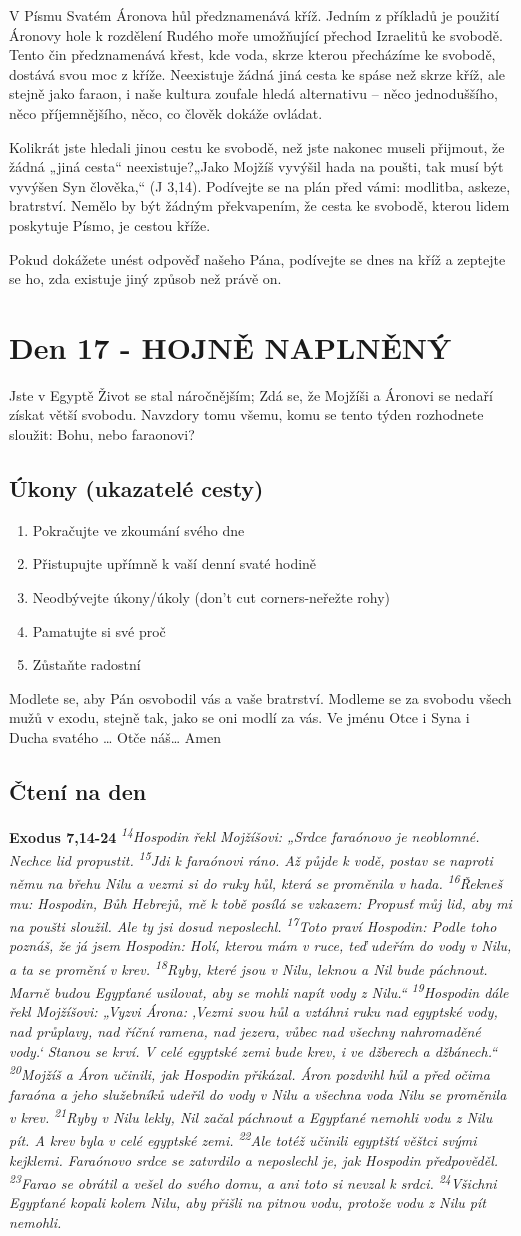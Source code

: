 \documentclass[11pt]{article}
\newcommand{\zacatekTretiTyden}{
  Jste v Egyptě \newline
  Život se stal náročnějším; Zdá se, že Mojžíši a Áronovi se nedaří získat větší svobodu. Navzdory tomu všemu,
komu se tento týden rozhodnete sloužit: Bohu, nebo faraonovi?

\subsection*{Úkony (ukazatelé cesty)}
\begin{enumerate}
  \item Pokračujte ve zkoumání svého dne
  \item Přistupujte upřímně k vaší denní svaté hodině
  \item Neodbývejte úkony/úkoly (don’t cut corners-neřežte rohy)
  \item Pamatujte si své proč
  \item Zůstaňte radostní
\end{enumerate}
Modlete se, aby Pán osvobodil vás a vaše bratrství. \newline
Modleme se za svobodu všech mužů v exodu, stejně tak, jako se oni modlí za vás.\newline
Ve jménu Otce i Syna i Ducha svatého …  Otče náš… Amen
}
\begin{document}
V Písmu Svatém Áronova hůl předznamenává kříž. Jedním z příkladů je použití Áronovy hole k rozdělení
Rudého moře umožňující přechod Izraelitů ke svobodě. Tento čin předznamenává křest, kde voda, skrze
kterou přecházíme ke svobodě, dostává svou moc z kříže. Neexistuje žádná jiná cesta ke spáse než skrze
kříž, ale stejně jako faraon, i naše kultura zoufale hledá alternativu – něco jednoduššího, něco
příjemnějšího, něco, co člověk dokáže ovládat.

Kolikrát jste hledali jinou cestu ke svobodě, než jste nakonec museli přijmout, že žádná „jiná cesta“
neexistuje?„Jako Mojžíš vyvýšil hada na poušti, tak musí být vyvýšen Syn člověka,“ (J 3,14). Podívejte
se na plán před vámi: modlitba, askeze, bratrství. Nemělo by být žádným překvapením, že cesta ke
svobodě, kterou lidem poskytuje Písmo, je cestou kříže.

Pokud dokážete unést odpověď našeho Pána, podívejte se dnes na kříž a zeptejte se ho, zda existuje jiný
způsob než právě on.

\newpage
\section{Den 17 - HOJNĚ NAPLNĚNÝ}
\zacatekTretiTyden
\subsection*{Čtení na den}
\textbf{Exodus 7,14-24}
\newline
\textit{ 
\textsuperscript{14}Hospodin řekl Mojžíšovi: „Srdce faraónovo je neoblomné. Nechce lid propustit.
\textsuperscript{15}Jdi k faraónovi ráno. Až půjde k vodě, postav se naproti němu na břehu Nilu a vezmi si do ruky hůl, která se proměnila v hada.
\textsuperscript{16}Řekneš mu: Hospodin, Bůh Hebrejů, mě k tobě posílá se vzkazem: Propusť můj lid, aby mi na poušti sloužil. Ale ty jsi dosud neposlechl.
\textsuperscript{17}Toto praví Hospodin: Podle toho poznáš, že já jsem Hospodin: Holí, kterou mám v ruce, teď udeřím do vody v Nilu, a ta se promění v krev.
\textsuperscript{18}Ryby, které jsou v Nilu, leknou a Nil bude páchnout. Marně budou Egypťané usilovat, aby se mohli napít vody z Nilu.“
\textsuperscript{19}Hospodin dále řekl Mojžíšovi: „Vyzvi Árona: ‚Vezmi svou hůl a vztáhni ruku nad egyptské vody, nad průplavy, nad říční ramena, nad jezera, vůbec nad všechny nahromaděné vody.‘ Stanou se krví. V celé egyptské zemi bude krev, i ve džberech a džbánech.“
\textsuperscript{20}Mojžíš a Áron učinili, jak Hospodin přikázal. Áron pozdvihl hůl a před očima faraóna a jeho služebníků udeřil do vody v Nilu a všechna voda Nilu se proměnila v krev.
\textsuperscript{21}Ryby v Nilu lekly, Nil začal páchnout a Egypťané nemohli vodu z Nilu pít. A krev byla v celé egyptské zemi.
\textsuperscript{22}Ale totéž učinili egyptští věštci svými kejklemi. Faraónovo srdce se zatvrdilo a neposlechl je, jak Hospodin předpověděl.
\textsuperscript{23}Farao se obrátil a vešel do svého domu, a ani toto si nevzal k srdci.
\textsuperscript{24}Všichni Egypťané kopali kolem Nilu, aby přišli na pitnou vodu, protože vodu z Nilu pít nemohli.
}
\end{document}

